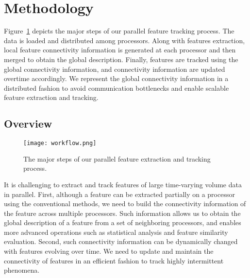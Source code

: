 \section{Methodology}

Figure~\ref{fig:workflow} depicts the major steps of our parallel feature tracking process. The data is loaded and distributed among processors. Along with features extraction, local feature connectivity information is generated at each processor and then merged to obtain the global description. Finally, features are tracked using the global connectivity information, and connectivity information are updated overtime accordingly. We represent the global connectivity information in a distributed fashion to avoid communication bottlenecks and enable scalable feature extraction and tracking.

\subsection{Overview}

\begin{figure}[t]
\centering
\texttt{[image: workflow.png]}
\caption{The major steps of our parallel feature extraction and tracking process.}
\label{fig:workflow}
\end{figure}


It is challenging to extract and track features of large time-varying volume data in parallel. First, although a feature can be extracted partially on a processor using the conventional methods, we need to build the connectivity information of the feature across multiple processors. Such information allows us to obtain the global description of a feature from a set of neighboring processors, and enables more advanced operations such as statistical analysis and feature similarity evaluation. Second, such connectivity information can be dynamically changed with features evolving over time. We need to update and maintain the connectivity of features in an efficient fashion to track highly intermittent phenomena.


